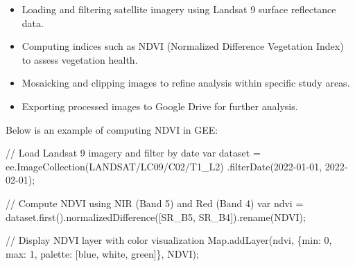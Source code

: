 \documentclass[
  letterpaper,
  DIV=11,
  numbers=noendperiod]{scrreprt}
\newenvironment{Shaded}{\begin{snugshade}}{\end{snugshade}}
\newcommand{\BuiltInTok}[1]{\textcolor[rgb]{0.00,0.23,0.31}{#1}}
\newcommand{\CommentTok}[1]{\textcolor[rgb]{0.37,0.37,0.37}{#1}}
\newcommand{\DataTypeTok}[1]{\textcolor[rgb]{0.68,0.00,0.00}{#1}}
\newcommand{\DecValTok}[1]{\textcolor[rgb]{0.68,0.00,0.00}{#1}}
\newcommand{\FunctionTok}[1]{\textcolor[rgb]{0.28,0.35,0.67}{#1}}
\newcommand{\KeywordTok}[1]{\textcolor[rgb]{0.00,0.23,0.31}{#1}}
\newcommand{\NormalTok}[1]{\textcolor[rgb]{0.00,0.23,0.31}{#1}}
\newcommand{\OperatorTok}[1]{\textcolor[rgb]{0.37,0.37,0.37}{#1}}
\newcommand{\StringTok}[1]{\textcolor[rgb]{0.13,0.47,0.30}{#1}}
\providecommand{\tightlist}{%
  \setlength{\itemsep}{0pt}\setlength{\parskip}{0pt}}\usepackage{longtable,booktabs,array}
\begin{document}
\begin{itemize}
\tightlist
\item
  Loading and filtering satellite imagery using Landsat 9 surface
  reflectance data.
\item
  Computing indices such as NDVI (Normalized Difference Vegetation
  Index) to assess vegetation health.
\item
  Mosaicking and clipping images to refine analysis within specific
  study areas.
\item
  Exporting processed images to Google Drive for further analysis.
\end{itemize}

Below is an example of computing NDVI in GEE:

\begin{Shaded}
\begin{Highlighting}[]
\CommentTok{// Load Landsat 9 imagery and filter by date}
\KeywordTok{var}\NormalTok{ dataset }\OperatorTok{=}\NormalTok{ ee}\OperatorTok{.}\FunctionTok{ImageCollection}\NormalTok{(}\StringTok{\textquotesingle{}LANDSAT/LC09/C02/T1\_L2\textquotesingle{}}\NormalTok{)}
    \OperatorTok{.}\FunctionTok{filterDate}\NormalTok{(}\StringTok{\textquotesingle{}2022{-}01{-}01\textquotesingle{}}\OperatorTok{,} \StringTok{\textquotesingle{}2022{-}02{-}01\textquotesingle{}}\NormalTok{)}\OperatorTok{;}

\CommentTok{// Compute NDVI using NIR (Band 5) and Red (Band 4)}
\KeywordTok{var}\NormalTok{ ndvi }\OperatorTok{=}\NormalTok{ dataset}\OperatorTok{.}\FunctionTok{first}\NormalTok{()}\OperatorTok{.}\FunctionTok{normalizedDifference}\NormalTok{([}\StringTok{\textquotesingle{}SR\_B5\textquotesingle{}}\OperatorTok{,} \StringTok{\textquotesingle{}SR\_B4\textquotesingle{}}\NormalTok{])}\OperatorTok{.}\FunctionTok{rename}\NormalTok{(}\StringTok{\textquotesingle{}NDVI\textquotesingle{}}\NormalTok{)}\OperatorTok{;}

\CommentTok{// Display NDVI layer with color visualization}
\BuiltInTok{Map}\OperatorTok{.}\FunctionTok{addLayer}\NormalTok{(ndvi}\OperatorTok{,}\NormalTok{ \{}\DataTypeTok{min}\OperatorTok{:} \DecValTok{0}\OperatorTok{,} \DataTypeTok{max}\OperatorTok{:} \DecValTok{1}\OperatorTok{,} \DataTypeTok{palette}\OperatorTok{:}\NormalTok{ [}\StringTok{\textquotesingle{}blue\textquotesingle{}}\OperatorTok{,} \StringTok{\textquotesingle{}white\textquotesingle{}}\OperatorTok{,} \StringTok{\textquotesingle{}green\textquotesingle{}}\NormalTok{]\}}\OperatorTok{,} \StringTok{\textquotesingle{}NDVI\textquotesingle{}}\NormalTok{)}\OperatorTok{;}
\end{Highlighting}
\end{Shaded}
\end{document}
